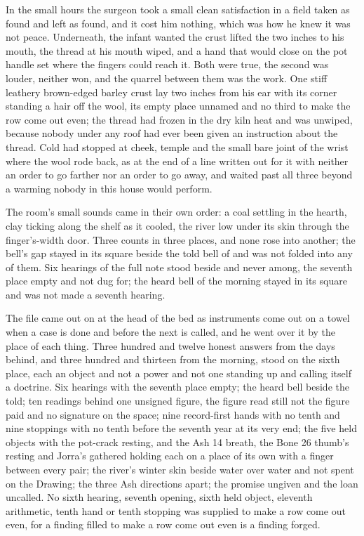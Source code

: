In the small hours the surgeon took a small clean satisfaction in a field taken as found and left as found, and it cost him nothing, which was how he knew it was not peace. Underneath, the infant wanted the crust lifted the two inches to his mouth, the thread at his mouth wiped, and a hand that would close on the pot handle set where the fingers could reach it. Both were true, the second was louder, neither won, and the quarrel between them was the work. One stiff leathery brown-edged barley crust lay two inches from his ear with its corner standing a hair off the wool, its empty place unnamed and no third to make the row come out even; the thread had frozen in the dry kiln heat and was unwiped, because nobody under any roof had ever been given an instruction about the thread. Cold had stopped at cheek, temple and the small bare joint of the wrist where the wool rode back, as at the end of a line written out for it with neither an order to go farther nor an order to go away, and  waited past all three beyond a warming nobody in this house would perform.

The room's small sounds came in their own order: a coal settling in the hearth, clay ticking along the shelf as it cooled, the river low under its skin through the finger's-width door. Three counts in three places, and none rose into another; the bell's gap stayed in its square beside the told bell of  and was not folded into any of them. Six hearings of the full note stood beside and never among, the seventh place empty and not dug for; the heard bell of the morning stayed in its square and was not made a seventh hearing.

The file came out on  at the head of the bed as instruments come out on a towel when a case is done and before the next is called, and he went over it by the place of each thing. Three hundred and twelve honest answers from the days behind, and three hundred and thirteen from the morning, stood on the sixth place, each an object and not a power and not one standing up and calling itself a doctrine. Six hearings with the seventh place empty; the heard bell beside the told; ten readings behind one unsigned figure, the figure read still not the figure paid and no signature on the space; nine record-first hands with no tenth and nine stoppings with no tenth before the seventh year at its very end; the five held objects with the pot-crack resting, and the Ash 14 breath, the Bone 26 thumb's resting and Jorra's gathered holding each on a place of its own with a finger between every pair; the river's winter skin beside water over water and not spent on the Drawing; the three Ash directions apart; the promise ungiven and the loan uncalled. No sixth hearing, seventh opening, sixth held object, eleventh arithmetic, tenth hand or tenth stopping was supplied to make a row come out even, for a finding filled to make a row come out even is a finding forged.

